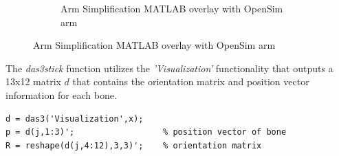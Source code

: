 \begin{figure}[h!]
\begin{subfigure}[b]{0.45\linewidth}
        \caption{Arm Simplification MATLAB overlay with OpenSim arm}
        \label{fig:armsimplification}
    \end{subfigure}

\end{figure}

The \textit{das3stick} function utilizes the \textit{'Visualization'} functionality that outputs a 13x12 matrix $d$ that contains the orientation matrix and position vector information for each bone.

\begin{lstlisting}[style=Matlab-editor]
d = das3('Visualization',x);   
p = d(j,1:3)';					% position vector of bone
R = reshape(d(j,4:12),3,3)';	% orientation matrix
 \end{lstlisting}

